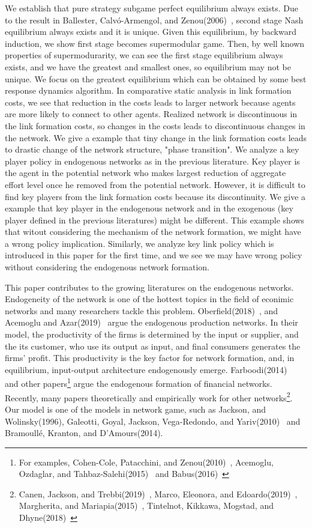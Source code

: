 \documentclass[12pt]{article}
\theoremstyle{definition}
\begin{document}
We establish that pure strategy subgame perfect equilibrium always exists.
Due to the result in Ballester, Calv\'{o}-Armengol, and Zenou(2006)~\cite{whowho}, second stage Nash equilibrium always exists and it is unique.
Given this equilibrium, by backward induction, we show first stage becomes supermodular game.
Then, by well known properties of supermodurarity, we can see the first stage equilibrium always exists, and we have the greatest and smallest ones, so equilibrium may not be unique.
We focus on the greatest equilibrium which can be obtained by some best response dynamics algorithm.
In comparative static analysis in link formation costs, we see that reduction in the costs leads to larger network because agents are more likely to connect to other agents.
Realized network is discontinuous in the link formation costs, so changes in the costs leads to discontinuous changes in the network.
We give a example that tiny change in the link formation costs leads to drastic change of the network structure, "phase transition".
We analyze a key player policy in endogenous networks as in the previous literature.
Key player is the agent in the potential network who makes largest reduction of aggregate effort level once he removed from the potential network.
However, it is difficult to find key players from the link formation costs because its discontinuity.
We give a example that key player in the endogenous network and in the exogenous (key player defined in the previous literatures) might be different.
This example shows that witout considering the mechanism of the network formation, we might have a wrong policy implication.
Similarly, we analyze key link policy which is introduced in this paper for the first time, and we see we may have wrong policy without considering the endogenous network formation.

This paper contributes to the growing literatures on the endogenous networks.
Endogeneity of the network is one of the hottest topics in the field of econimic networks and many researchers tackle this problem.
Oberfield(2018)~\cite{ober}, and Acemoglu and Azar(2019)~\cite{endo_net} argue the endogenous production networks.
In their model, the productivity of the firms is determined by the input or supplier, and the its customer, who use its output as input, and final consumers generates the firms' profit.
This productivity is the key factor for network formation, and, in equilibrium, input-output architecture endogenously emerge.
Farboodi(2014)~\cite{farboodi} and other papers\footnote{For examples, Cohen-Cole, Patacchini, and Zenou(2010)~\cite{cohen}, Acemoglu, Ozdaglar, and Tahbaz-Salehi(2015)~\cite{acemo2015} and Babus(2016)~\cite{babus}} argue the endogenous formation of financial networks.
Recently, many papers theoretically and empirically work for other networks\footnote{Canen, Jackson, and Trebbi(2019)~\cite{canen}, Marco, Eleonora, and Edoardo(2019)~\cite{Marco2019}, Margherita, and Mariapia(2015)~\cite{marg}, Tintelnot, Kikkawa, Mogstad, and Dhyne(2018)~\cite{Tin}}.
Our model is one of the models in network game, such as Jackson, and Wolinsky(1996), Galeotti, Goyal, Jackson, Vega-Redondo, and Yariv(2010)~\cite{galeo} and Bramoull\'{e}, Kranton, and D'Amours(2014).
\end{document}
